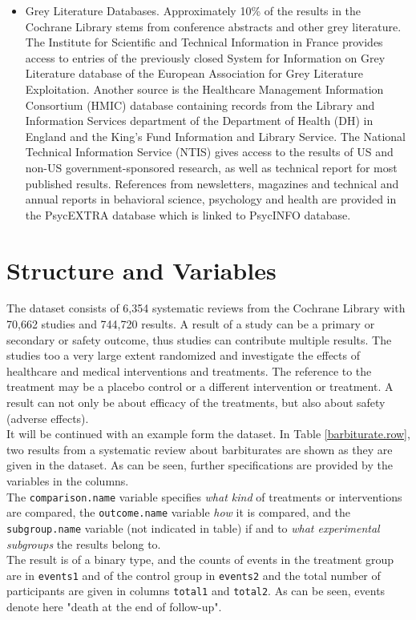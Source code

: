 \documentclass[11pt,a4paper,twoside]{book}\usepackage[]{graphicx}\usepackage[]{color}
\begin{document}
\begin{itemize}
\item Grey Literature Databases. Approximately 10\% of the results in the Cochrane Library stems from conference abstracts and other grey literature. The Institute for Scientific and Technical Information in France provides access to entries of the previously closed System for Information on Grey Literature database of the European Association for Grey Literature Exploitation. Another source is the Healthcare Management Information Consortium (HMIC) database containing records from the Library and Information Services department of the Department of Health (DH) in England and the King's Fund Information and Library Service. The National Technical Information Service (NTIS) gives access to the results of US and non-US government-sponsored research, as well as technical report for most published results. References from newsletters, magazines and technical and annual reports in behavioral science, psychology and health are provided in the PsycEXTRA database which is linked to PsycINFO database.
\end{itemize}


\section{Structure and Variables}
The dataset consists of 6,354 systematic reviews from the Cochrane Library with 70,662 studies and 744,720 results. A result of a study can be a primary or secondary or safety outcome, thus studies can contribute multiple results. The studies too a very large extent randomized and investigate the effects of healthcare and medical interventions and treatments. The reference to the treatment may be a placebo control or a different intervention or treatment. A result can not only be about efficacy of the treatments, but also about safety (adverse effects).\\
It will be continued with an example form the dataset. In Table \ref{barbiturate.row}, two results from a systematic review about barbiturates are shown as they are given in the dataset. As can be seen, further specifications are provided by the variables in the columns. \\
The \texttt{comparison.name} variable specifies \textit{what kind} of treatments or interventions are compared, the \texttt{outcome.name} variable \textit{how} it is compared, and the \texttt{subgroup.name} variable (not indicated in table) if and to \textit{what experimental subgroups} the results belong to. \\
The result is of a binary type, and the counts of events in the treatment group are in \texttt{events1} and of the control group in \texttt{events2} and the total number of participants are given in columns \texttt{total1} and \texttt{total2}. As can be seen, events denote here "death at the end of follow-up".
\end{document}
